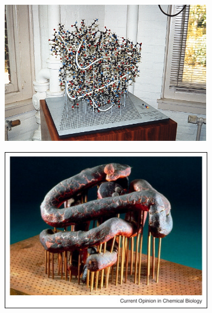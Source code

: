 \begin{figure}
  \begin{subfigure}{.5\textwidth}
  \centering
  {\includegraphics[width=0.9\linewidth]{./figures/ch1/kendrew_myoglobin_ball_and_spokes}}
  \caption{}
    \label{Fig:kendrew_myoglobin_ball_and_spokes}
  \end{subfigure}%
  \begin{subfigure}{.5\textwidth}
  \centering
  {\includegraphics[width=0.9\linewidth]{./figures/ch1/kendrew_myoglobin_plasticine}}
  \caption{}
  \label{Fig:kendrew_plasticine}
  \end{subfigure}%
  \\[\baselineskip]
  \begin{subfigure}{.5\textwidth}
  \centering

\end{subfigure}
\end{figure}
